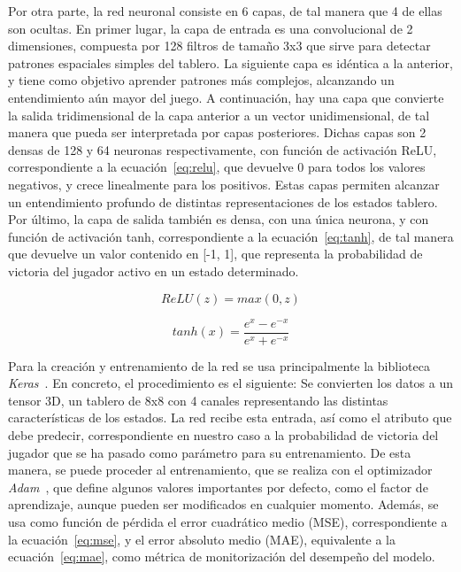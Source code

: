 \documentclass[conference,a4paper]{IEEEtran}
\begin{document}
Por otra parte, la red neuronal consiste en 6 capas, de tal manera que 4 de ellas son ocultas. En primer lugar, la capa de entrada es una convolucional de 2 dimensiones, 
compuesta por 128 filtros de tamaño 3x3 que sirve para detectar patrones espaciales simples del tablero. La siguiente capa es idéntica a la anterior, 
y tiene como objetivo aprender patrones más complejos, alcanzando un entendimiento aún mayor del juego. A continuación, hay una capa que convierte 
la salida tridimensional de la capa anterior a un vector unidimensional, de tal manera que pueda ser interpretada por capas posteriores. 
Dichas capas son 2 densas de 128 y 64 neuronas respectivamente, con función de activación ReLU, correspondiente a la ecuación~\eqref{eq:relu}, que devuelve 0 para 
todos los valores negativos, y crece linealmente para los positivos. Estas capas permiten alcanzar un entendimiento profundo de distintas representaciones 
de los estados tablero. Por último, la capa de salida también es densa, con una única neurona, y con función de activación tanh, correspondiente
a la ecuación~\eqref{eq:tanh}, de tal manera que devuelve un valor contenido en [-1, 1], que representa la probabilidad de victoria del jugador activo en un estado determinado.

\begin{equation}
  \label{eq:relu}
  ReLU(z) = max(0, z)
\end{equation}

\begin{equation}
  \label{eq:tanh}
  tanh(x) = \frac{e^x - e^{-x}}{e^x + e^{-x}}
\end{equation}

Para la creación y entrenamiento de la red se usa principalmente la biblioteca \emph{Keras}~\cite{b12}. En concreto, el procedimiento es el siguiente:  
Se convierten los datos a un tensor 3D, un tablero de 8x8 con 4 canales representando las distintas características de los estados. 
La red recibe esta entrada, así como el atributo que debe predecir, correspondiente en nuestro caso a la probabilidad de victoria del jugador 
que se ha pasado como parámetro para su entrenamiento. De esta manera, se puede proceder al entrenamiento, que se realiza con el 
optimizador \emph{Adam}~\cite{b13}, que define algunos valores importantes por defecto, como el factor de aprendizaje, aunque pueden ser modificados 
en cualquier momento. Además, se usa como función de pérdida el error cuadrático medio (MSE), correspondiente a la ecuación~\eqref{eq:mse}, y el error 
absoluto medio (MAE), equivalente a la ecuación~\eqref{eq:mae}, como métrica de monitorización del desempeño del modelo. 
\end{document}
